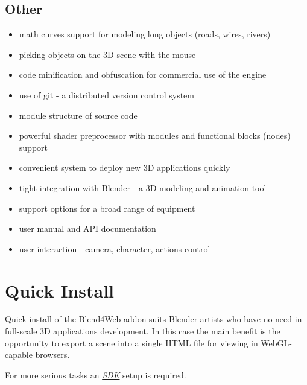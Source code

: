 \documentclass[a4paper,12pt,oneside]{sphinxmanual}
\begin{document}
\section{Other}
\label{features:id14}\begin{itemize}
\item {} 
math curves support for modeling long objects (roads, wires, rivers)

\item {} 
picking objects on the 3D scene with the mouse

\item {} 
code minification and obfuscation for commercial use of the engine

\item {} 
use of git - a distributed version control system

\item {} 
module structure of source code

\item {} 
powerful shader preprocessor with modules and functional blocks (nodes) support

\item {} 
convenient system to deploy new 3D applications quickly

\item {} 
tight integration with Blender - a 3D modeling and animation tool

\item {} 
support options for a broad range of equipment

\item {} 
user manual and API documentation

\item {} 
user interaction - camera, character, actions control

\end{itemize}


\chapter{Quick Install}
\label{first_steps:first-steps}\label{first_steps::doc}\label{first_steps:id1}
Quick install of the Blend4Web addon suits Blender artists who have no need in full-scale 3D applications development. In this case the main benefit is the opportunity to export a scene into a single HTML file for viewing in WebGL-capable browsers.

For more serious tasks an {\hyperref[setup:setup]{\emph{SDK}}} setup is required.
\end{document}
